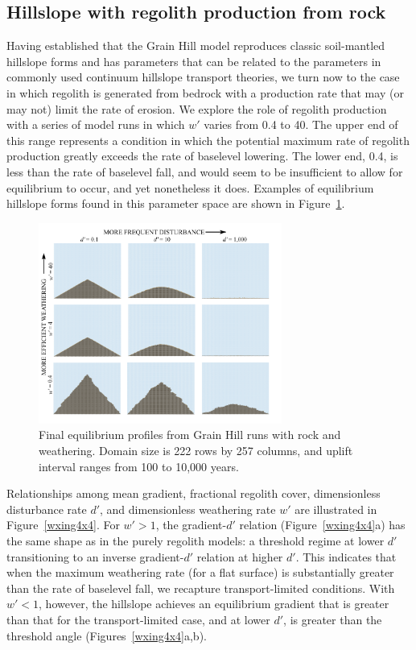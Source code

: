 \documentclass[esurf, manuscript]{copernicus}
\begin{document}
\subsection{Hillslope with regolith production from rock}

Having established that the Grain Hill model reproduces classic soil-mantled hillslope forms and has parameters that can be related to the parameters in commonly used continuum hillslope transport theories, we turn now to the case in which regolith is generated from bedrock with a production rate that may (or may not) limit the rate of erosion.  We explore the role of regolith production with a series of model runs in which $w'$ varies from 0.4 to 40. The upper end of this range represents a condition in which the potential maximum rate of regolith production greatly exceeds the rate of baselevel lowering. The lower end, 0.4, is less than the rate of baselevel fall, and would seem to be insufficient to allow for equilibrium to occur, and yet nonetheless it does. %
Examples of equilibrium hillslope forms found in this parameter space are shown in Figure~\ref{wxhills3x3}.

\begin{figure}[t]
\includegraphics[width=8cm]{Figures/weathered_hills_3x3.pdf}
\caption{Final equilibrium profiles from Grain Hill runs with rock and weathering. Domain size is 222 rows by 257 columns, and uplift interval ranges from 100 to 10,000 years.}
\label{wxhills3x3}
\end{figure}


Relationships among mean gradient, fractional regolith cover, dimensionless disturbance rate $d'$, and dimensionless weathering rate $w'$ are illustrated in Figure~\ref{wxing4x4}. For $w' > 1$, the gradient-$d'$ relation (Figure~\ref{wxing4x4}a) has the same shape as in the purely regolith models: a threshold regime at lower $d'$ transitioning to an inverse gradient-$d'$ relation at higher $d'$. This indicates that when the maximum weathering rate (for a flat surface) is substantially greater than the rate of baselevel fall, we recapture transport-limited conditions. With $w'<1$, however, the hillslope achieves an equilibrium gradient that is greater than that for the transport-limited case, and at lower $d'$, is greater than the threshold angle (Figures~\ref{wxing4x4}a,b).
\end{document}
